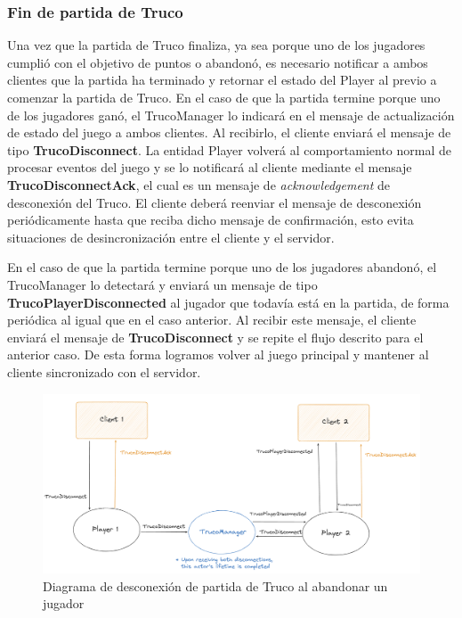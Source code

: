 \subsubsection{Fin de partida de Truco}

\noindent Una vez que la partida de Truco finaliza, ya sea porque uno de los jugadores cumplió con el objetivo de puntos o abandonó, es necesario notificar a ambos clientes que la partida ha terminado y retornar el estado del Player al previo a comenzar la partida de Truco.
En el caso de que la partida termine porque uno de los jugadores ganó, el TrucoManager lo indicará en el mensaje de actualización de estado del juego a ambos clientes. Al recibirlo, el cliente enviará el mensaje de tipo \textbf{TrucoDisconnect}. La entidad Player volverá
al comportamiento normal de procesar eventos del juego y se lo notificará al cliente mediante el mensaje \textbf{TrucoDisconnectAck}, el cual es un mensaje de \textit{acknowledgement} de desconexión del Truco. El cliente deberá reenviar el mensaje de desconexión periódicamente hasta
que reciba dicho mensaje de confirmación, esto evita situaciones de desincronización entre el cliente y el servidor.

En el caso de que la partida termine porque uno de los jugadores abandonó, el TrucoManager lo detectará y enviará un mensaje de tipo \textbf{TrucoPlayerDisconnected} al jugador que todavía está en la partida, de forma periódica al igual que en el caso anterior. Al recibir este mensaje,
el cliente enviará el mensaje de \textbf{TrucoDisconnect} y se repite el flujo descrito para el anterior caso. De esta forma logramos volver al juego principal y mantener al cliente sincronizado con el servidor.

\newpage

\begin{figure}[htbp]
    \centering
    \includegraphics[width=1\textwidth]{../assets/truco-disconnection.png}
    \caption{Diagrama de desconexión de partida de Truco al abandonar un jugador}
\end{figure}

